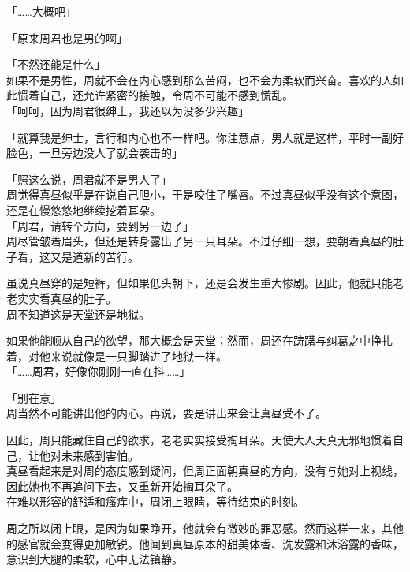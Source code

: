 「……大概吧」

「原来周君也是男的啊」

「不然还能是什么」\\

如果不是男性，周就不会在内心感到那么苦闷，也不会为柔软而兴奋。喜欢的人如此惯着自己，还允许紧密的接触，令周不可能不感到慌乱。\\

「呵呵，因为周君很绅士，我还以为没多少兴趣」

「就算我是绅士，言行和内心也不一样吧。你注意点，男人就是这样，平时一副好脸色，一旦旁边没人了就会袭击的」

「照这么说，周君就不是男人了」\\

周觉得真昼似乎是在说自己胆小，于是咬住了嘴唇。不过真昼似乎没有这个意图，还是在慢悠悠地继续挖着耳朵。\\

「周君，请转个方向，要到另一边了」\\

周尽管皱着眉头，但还是转身露出了另一只耳朵。不过仔细一想，要朝着真昼的肚子看，这又是道新的苦行。

虽说真昼穿的是短裤，但如果低头朝下，还是会发生重大惨剧。因此，他就只能老老实实看真昼的肚子。\\

周不知道这是天堂还是地狱。

如果他能顺从自己的欲望，那大概会是天堂；然而，周还在踌躇与纠葛之中挣扎着，对他来说就像是一只脚踏进了地狱一样。\\

「……周君，好像你刚刚一直在抖……」

「别在意」\\

周当然不可能讲出他的内心。再说，要是讲出来会让真昼受不了。

因此，周只能藏住自己的欲求，老老实实接受掏耳朵。天使大人天真无邪地惯着自己，让他对未来感到害怕。\\

真昼看起来是对周的态度感到疑问，但周正面朝真昼的方向，没有与她对上视线，因此她也不再追问下去，又重新开始掏耳朵了。\\

在难以形容的舒适和瘙痒中，周闭上眼睛，等待结束的时刻。

周之所以闭上眼，是因为如果睁开，他就会有微妙的罪恶感。然而这样一来，其他的感官就会变得更加敏锐。他闻到真昼原本的甜美体香、洗发露和沐浴露的香味，意识到大腿的柔软，心中无法镇静。\\

